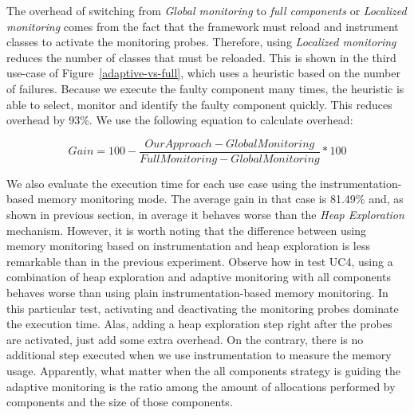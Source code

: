 The overhead of switching from \emph{Global monitoring} to \emph{full components} or \emph{Localized monitoring} comes from the fact that the framework must reload and instrument classes to activate the monitoring probes.
Therefore, using \emph{Localized monitoring} reduces the number of classes that must be reloaded.
This is shown in the third use-case of Figure~\ref{adaptive-vs-full}, which uses a heuristic based on the number of failures.
Because we execute the faulty component many times, the heuristic is able to select, monitor and identify the faulty component quickly. This reduces overhead by 93\%. We use the following equation to calculate overhead:

\[ Gain=100-\frac{OurApproach-GlobalMonitoring}{FullMonitoring-GlobalMonitoring}*100 \]

We also evaluate the execution time for each use case using the instrumentation-based memory monitoring mode.
The average gain in that case is 81.49\% and, as shown in previous section, in average it behaves worse than the \textit{Heap Exploration} mechanism.
However, it is worth noting that the difference between using memory monitoring based on instrumentation and heap exploration is less remarkable than in the previous experiment.
Observe how in test UC4, using a combination of heap exploration and adaptive monitoring with all components behaves worse than using plain instrumentation-based memory monitoring.
In this particular test, activating and deactivating the monitoring probes dominate the execution time.
Alas, adding a heap exploration step right after the probes are activated, just add some extra overhead.
On the contrary, there is no additional step executed when we use instrumentation to measure the memory usage.
Apparently, what matter when the all components strategy is guiding the adaptive monitoring is the ratio among the amount of allocations performed by components and the size of those components.

